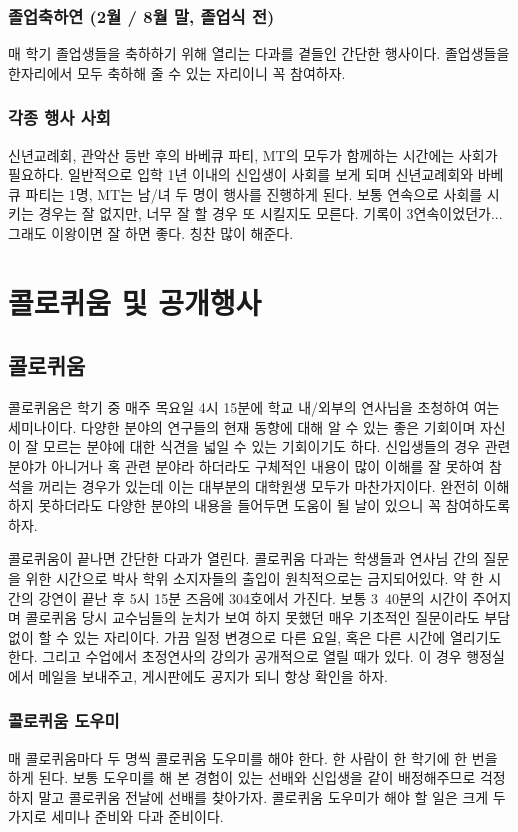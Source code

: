 \subsubsection{졸업축하연 (2월 / 8월 말, 졸업식 전)}
매 학기 졸업생들을 축하하기 위해 열리는 다과를 곁들인 간단한 행사이다. 졸업생들을
한자리에서 모두 축하해 줄 수 있는 자리이니 꼭 참여하자.

\subsubsection{각종 행사 사회}
신년교례회, 관악산 등반 후의 바베큐 파티, MT의 모두가 함께하는 시간에는 사회가
필요하다. 일반적으로 입학 1년 이내의 신입생이 사회를 보게 되며 신년교례회와
바베큐 파티는 1명, MT는 남/녀 두 명이 행사를 진행하게 된다.  보통 연속으로 사회를
시키는 경우는 잘 없지만, 너무 잘 할 경우 또 시킬지도 모른다. 기록이
3연속이었던가... 그래도 이왕이면 잘 하면 좋다. 칭찬 많이 해준다.

\section{콜로퀴움 및 공개행사}
\subsection{콜로퀴움}
콜로퀴움은 학기 중 매주 목요일 4시 15분에 학교 내/외부의 연사님을 초청하여 여는
세미나이다. 다양한 분야의 연구들의 현재 동향에 대해 알 수 있는 좋은 기회이며
자신이 잘 모르는 분야에 대한 식견을 넓일 수 있는 기회이기도 하다. 신입생들의 경우
관련 분야가 아니거나 혹 관련 분야라 하더라도 구체적인 내용이 많이 이해를 잘
못하여 참석을 꺼리는 경우가 있는데 이는 대부분의 대학원생 모두가
마찬가지이다. 완전히 이해하지 못하더라도 다양한 분야의 내용을 들어두면 도움이 될
날이 있으니 꼭 참여하도록 하자.

콜로퀴움이 끝나면 간단한 다과가 열린다. 콜로퀴움 다과는 학생들과 연사님 간의
질문을 위한 시간으로 박사 학위 소지자들의 출입이 원칙적으로는 금지되어있다. 약 한
시간의 강연이 끝난 후 5시 15분 즈음에 304호에서 가진다. 보통 3~40분의 시간이
주어지며 콜로퀴움 당시 교수님들의 눈치가 보여 하지 못했던 매우 기초적인
질문이라도 부담 없이 할 수 있는 자리이다. 가끔 일정 변경으로 다른 요일, 혹은 다른
시간에 열리기도 한다. 그리고 수업에서 초정연사의 강의가 공개적으로 열릴 때가
있다. 이 경우 행정실에서 메일을 보내주고, 게시판에도 공지가 되니 항상 확인을
하자.

\subsubsection{콜로퀴움 도우미}
매 콜로퀴움마다 두 명씩 콜로퀴움 도우미를 해야 한다. 한 사람이 한 학기에 한 번을
하게 된다. 보통 도우미를 해 본 경험이 있는 선배와 신입생을 같이 배정해주므로
걱정하지 말고 콜로퀴움 전날에 선배를 찾아가자. 콜로퀴움 도우미가 해야 할 일은
크게 두 가지로 세미나 준비와 다과 준비이다.

